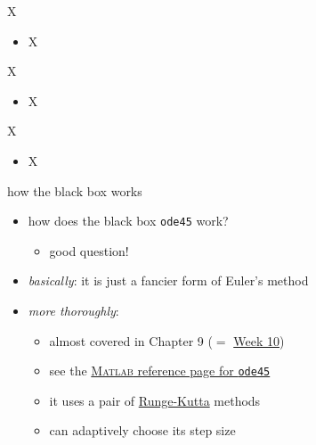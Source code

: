 \documentclass[urlcolor=blue,dvipsnames]{beamer}
\newcommand{\Matlab}{\textsc{Matlab}\xspace}
\begin{document}
\begin{frame}{X}

\begin{itemize}
\item X
\end{itemize}
\end{frame}


\begin{frame}{X}

\begin{itemize}
\item X
\end{itemize}
\end{frame}


\begin{frame}{X}

\begin{itemize}
\item X
\end{itemize}
\end{frame}


\begin{frame}{how the black box works}

\begin{itemize}
\item how does the black box \texttt{ode45} work?
    \begin{itemize}
    \item good question!
    \end{itemize}
\item \emph{basically}:  it is just a fancier form of Euler's method
\item \emph{more thoroughly}:
    \begin{itemize}
    \item almost covered in Chapter 9 ($=$ \href{https://bueler.github.io/math302/week10.html}{Week 10})
    \item see the \href{https://www.mathworks.com/help/matlab/ref/ode45.html}{\Matlab reference page for \texttt{ode45}}
    \item it uses a pair of \href{https://en.wikipedia.org/wiki/Runge_Kutta_methods}{Runge-Kutta} methods
    \item can adaptively choose its step size
    \end{itemize}
\end{itemize}
\end{frame}
\end{document}
